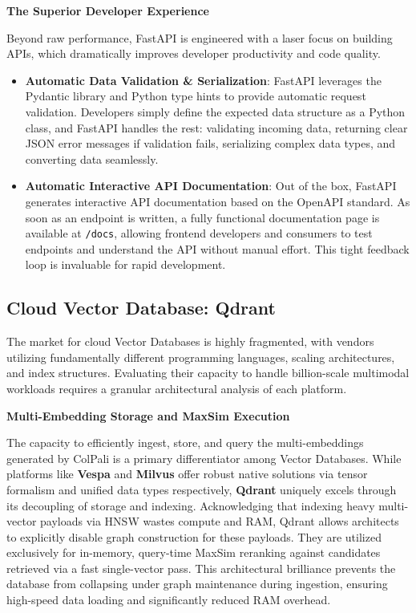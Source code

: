 \textbf{The Superior Developer Experience}

Beyond raw performance, FastAPI is engineered with a laser focus on building APIs, which dramatically improves developer productivity and code quality.

\begin{itemize}
    \item \textbf{Automatic Data Validation \& Serialization}: FastAPI leverages the Pydantic library and Python type hints to provide automatic request validation. Developers simply define the expected data structure as a Python class, and FastAPI handles the rest: validating incoming data, returning clear JSON error messages if validation fails, serializing complex data types, and converting data seamlessly.
    \item \textbf{Automatic Interactive API Documentation}: Out of the box, FastAPI generates interactive API documentation based on the OpenAPI standard. As soon as an endpoint is written, a fully functional documentation page is available at \texttt{/docs}, allowing frontend developers and consumers to test endpoints and understand the API without manual effort. This tight feedback loop is invaluable for rapid development.
\end{itemize}

\subsection{Cloud Vector Database: Qdrant}

The market for cloud Vector Databases is highly fragmented, with vendors utilizing fundamentally different programming languages, scaling architectures, and index structures. Evaluating their capacity to handle billion-scale multimodal workloads requires a granular architectural analysis of each platform.

\textbf{Multi-Embedding Storage and MaxSim Execution}

The capacity to efficiently ingest, store, and query the multi-embeddings generated by ColPali is a primary differentiator among Vector Databases. While platforms like \textbf{Vespa} and \textbf{Milvus} offer robust native solutions via tensor formalism and unified data types respectively, \textbf{Qdrant} uniquely excels through its decoupling of storage and indexing. Acknowledging that indexing heavy multi-vector payloads via HNSW wastes compute and RAM, Qdrant allows architects to explicitly disable graph construction for these payloads. They are utilized exclusively for in-memory, query-time MaxSim reranking against candidates retrieved via a fast single-vector pass. This architectural brilliance prevents the database from collapsing under graph maintenance during ingestion, ensuring high-speed data loading and significantly reduced RAM overhead.

